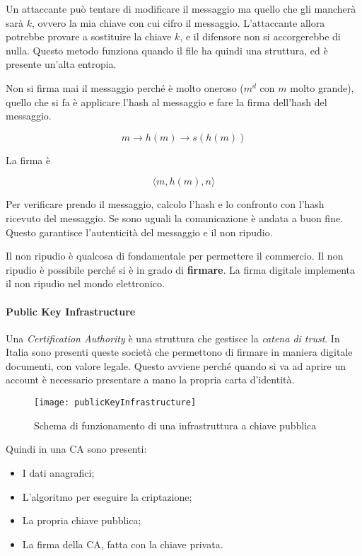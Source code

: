Un attaccante può tentare di modificare il messaggio ma quello che gli mancherà
sarà $k$, ovvero la mia chiave con cui cifro il messaggio.
L'attaccante allora potrebbe provare a sostituire la chiave $k$, e il difensore
non si accorgerebbe di nulla. Questo metodo funziona quando il file ha quindi
una struttura, ed è presente un'alta entropia.

Non si firma mai il messaggio perché è molto oneroso ($m^d$ con $m$ molto
grande), quello che si fa è applicare l'hash al messaggio e fare la firma
dell'hash del messaggio.

$$
m \rightarrow h(m) \rightarrow s(h(m))
$$

La firma è

$$
\langle m, h(m), n \rangle
$$

Per verificare prendo il messaggio, calcolo l'hash e lo confronto con l'hash
ricevuto del messaggio. Se sono uguali la comunicazione è andata a buon fine.
Questo garantisce l'autenticità del messaggio e il non ripudio.

Il non ripudio è qualcosa di fondamentale per permettere il commercio. Il non
ripudio è possibile perché si è in grado di \textbf{firmare}. La firma digitale
implementa il non ripudio nel mondo elettronico.

\paragraph{Public Key Infrastructure}

Una \textit{Certification Authority} è una struttura che gestisce la
\textit{catena di trust}. In Italia sono presenti queste società che permettono
di firmare in maniera digitale documenti, con valore legale. Questo avviene
perché quando si va ad aprire un account è necessario presentare a mano la
propria carta d'identità.


\begin{figure}[H]
 \centering
 \texttt{[image: publicKeyInfrastructure]}
 \caption{Schema di funzionamento di una infrastruttura a chiave pubblica}
\end{figure}

Quindi in una CA sono presenti:
\begin{itemize}
\item I dati anagrafici;
\item L'algoritmo per eseguire la criptazione;
\item La propria chiave pubblica;
\item La firma della CA, fatta con la chiave privata.
\end{itemize}

